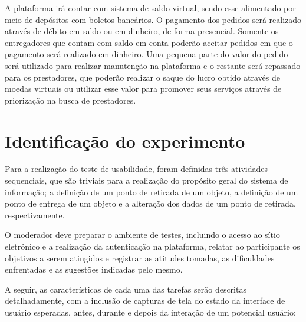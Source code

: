 \documentclass[
	article,
	11pt,
	oneside,
	a4paper,
	english,
	brazil,
	sumario=tradicional
]{abntex2}
\begin{document}
	A plataforma irá contar com sistema de saldo virtual, sendo esse alimentado por meio de depósitos com boletos bancários. O pagamento dos pedidos será realizado através de débito em saldo ou em dinheiro, de forma presencial. Somente os entregadores que contam com saldo em conta poderão aceitar pedidos em que o pagamento será realizado em dinheiro. Uma pequena parte do valor do pedido será utilizado para realizar manutenção na plataforma e o restante será repassado para os prestadores, que poderão realizar o saque do lucro obtido através de moedas virtuais ou utilizar esse valor para promover seus serviços através de priorização na busca de prestadores.
	
\vspace*{\fill}
\pagebreak

\section*{Identificação do experimento}
	
	Para a realização do teste de usabilidade, foram definidas três atividades sequenciais, que são triviais para a realização do propósito geral do sistema de informação; a definição de um ponto de retirada de um objeto, a definição de um ponto de entrega de um objeto e a alteração dos dados de um ponto de retirada, respectivamente.
	
	O moderador deve preparar o ambiente de testes, incluindo o acesso ao sítio eletrônico e a realização da autenticação na plataforma, relatar ao participante os objetivos a serem atingidos e registrar as atitudes tomadas, as dificuldades enfrentadas e as sugestões indicadas pelo mesmo.
	
	A seguir, as características de cada uma das tarefas serão descritas detalhadamente, com a inclusão de capturas de tela do estado da interface de usuário esperadas, antes, durante e depois da interação de um potencial usuário:
	
\end{document}
